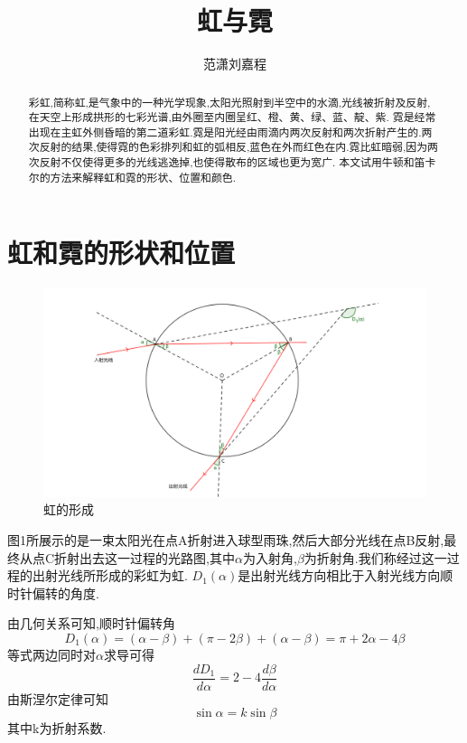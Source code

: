 \documentclass[a4paper]{article}%
\title{虹与霓}%
\author{范潇\phantom{1}刘嘉程}%
\date{}%
\begin{document}
  \maketitle  
\begin{abstract}
   彩虹,简称虹,是气象中的一种光学现象,太阳光照射到半空中的水滴,光线被折射及反射,在天空上形成拱形的七彩光谱,由外圈至内圈呈红、橙、黄、绿、蓝、靛、紫.
   霓是经常出现在主虹外侧昏暗的第二道彩虹.霓是阳光经由雨滴内两次反射和两次折射产生的.两次反射的结果,使得霓的色彩排列和虹的弧相反,蓝色在外而红色在内.霓比虹暗弱,因为两次反射不仅使得更多的光线逃逸掉,也使得散布的区域也更为宽广.
   本文试用牛顿和笛卡尔的方法来解释虹和霓的形状、位置和颜色.
\end{abstract}

\section{虹和霓的形状和位置}
\begin{figure}[ht]
   \centering
   \includegraphics[scale=0.8]{图1}
   \caption[图1]{虹的形成}\label{fig-图1}
   \end{figure}
图1所展示的是一束太阳光在点A折射进入球型雨珠,然后大部分光线在点B反射,最终从点C折射出去这一过程的光路图,其中$\alpha$为入射角,$\beta$为折射角.我们称经过这一过程的出射光线所形成的彩虹为虹.
$D_1(\alpha)$是出射光线方向相比于入射光线方向顺时针偏转的角度.


由几何关系可知,顺时针偏转角
\begin{equation*}
D_1(\alpha)=(\alpha-\beta)+(\pi-2\beta)+(\alpha-\beta)=\pi+2\alpha-4\beta\tag{式1}
\end{equation*}
等式两边同时对$\alpha$求导可得
\begin{equation*}
\frac{dD_1}{d\alpha}=2-4\frac{d\beta}{d\alpha}\tag{式2}
\end{equation*}
由斯涅尔定律可知
\begin{equation*}
\sin\alpha=k\sin\beta\tag{式3}
\end{equation*}
其中k为折射系数.
\end{document}
